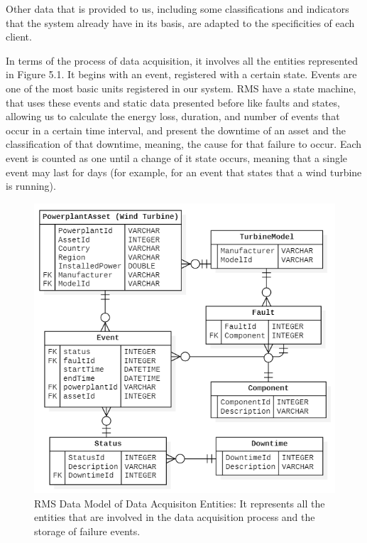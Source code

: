 Other data that is provided to us, including some classifications and indicators that the system already have in its basis, are adapted to the specificities of each client.

In terms of the process of data acquisition, it involves all the entities represented in Figure 5.1. It begins with an event, registered with a certain state. Events are one of the most basic units registered in our system. RMS have a state machine, that uses these events and static data presented before like faults and states, allowing us to calculate the energy loss, duration, and number of events that occur in a certain time interval, and present the downtime of an asset and the classification of that downtime, meaning, the cause for that failure to occur. Each event is counted as one until a change of it state occurs, meaning that a single event may last for days (for example, for an event that states that a wind turbine is running).

\begin{figure}[htbp]
	\centering
	\includegraphics[scale=0.7]{Chapters/Figures/methodology_fig10.png}
	\caption{RMS Data Model of Data Acquisiton Entities: It represents all the entities that are involved in the data acquisition process and the storage of failure events.}
	\label{fig:Figuras_Tree_silhouettes-vectorial}
\end{figure}

